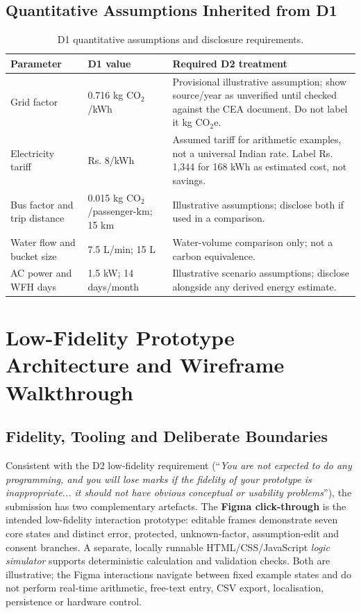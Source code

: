 \documentclass[12pt,a4paper]{article}
\begin{document}
\subsection{Quantitative Assumptions Inherited from D1}
\begin{table}[H]
\centering
\small
\caption{D1 quantitative assumptions and disclosure requirements.}
\begin{tabularx}{\textwidth}{@{}p{3.1cm}p{3.2cm}X@{}}
\toprule
\textbf{Parameter} & \textbf{D1 value} & \textbf{Required D2 treatment}\\
\midrule
Grid factor & 0.716 kg CO$_2$/kWh & Provisional illustrative assumption; show source/year as unverified until checked against the CEA document. Do not label it kg CO$_2$e.\\
Electricity tariff & Rs. 8/kWh & Assumed tariff for arithmetic examples, not a universal Indian rate. Label Rs. 1,344 for 168 kWh as estimated cost, not savings.\\
Bus factor and trip distance & 0.015 kg CO$_2$/passenger-km; 15 km & Illustrative assumptions; disclose both if used in a comparison.\\
Water flow and bucket size & 7.5 L/min; 15 L & Water-volume comparison only; not a carbon equivalence.\\
AC power and WFH days & 1.5 kW; 14 days/month & Illustrative scenario assumptions; disclose alongside any derived energy estimate.\\
\bottomrule
\end{tabularx}
\end{table}


\section{Low-Fidelity Prototype Architecture and Wireframe Walkthrough}

\subsection{Fidelity, Tooling and Deliberate Boundaries}
Consistent with the D2 low-fidelity requirement (``\emph{You are not expected to do any programming, and you will lose marks if the fidelity of your prototype is inappropriate... it should not have obvious conceptual or usability problems}''), the submission has two complementary artefacts. The \textbf{Figma click-through} is the intended low-fidelity interaction prototype: editable frames demonstrate seven core states and distinct error, protected, unknown-factor, assumption-edit and consent branches. A separate, locally runnable HTML/CSS/JavaScript \emph{logic simulator} supports deterministic calculation and validation checks. Both are illustrative; the Figma interactions navigate between fixed example states and do not perform real-time arithmetic, free-text entry, CSV export, localisation, persistence or hardware control.
\end{document}
